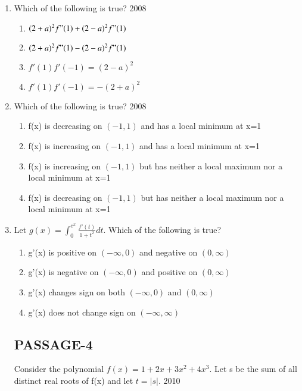 \documentclass[journal,12pt,twocolumn]{IEEEtran}
\theoremstyle{remark}
\begin{document}
\begin{enumerate}
 \item Which of the following is true?
\hfill{2008}
\begin{enumerate}
    \item $(2+a)^2 f"(1)+(2-a)^2 f"(1)$ 
    \item $(2+a)^2 f"(1)-(2-a)^2 f"(1)$
    \item $f'(1)f'(-1)=(2-a)^2$ 
     \item $f'(1)f'(-1)=-(2+a)^2$ 
\end{enumerate}
\item Which of the following is true?
\hfill{2008}
\begin{enumerate}
    \item f(x) is decreasing on $(-1,1)$ and has a local minimum at x=1
    \item f(x) is increasing on $(-1,1)$ and has a local minimum at x=1
    \item f(x) is increasing on $(-1,1)$ but has neither a local maximum nor a local minimum at x=1
    \item f(x) is decreasing on $(-1,1)$ but has neither a local maximum nor a local minimum at x=1
\end{enumerate}
\item Let $g(x)=\int_{0}^{e^x}\frac{f'(t)}{1+t^2}dt$. Which of the following is true?
\begin{enumerate}
    \item g'(x) is positive on $(-\infty,0)$ and negative on $(0,\infty)$
     \item g'(x) is negative on $(-\infty,0)$ and positive on $(0,\infty)$
     \item g'(x) changes sign on both $(-\infty,0)$ and $(0,\infty)$
     \item g'(x) does not change sign on $(-\infty,\infty)$  
\end{enumerate}
\subsection{PASSAGE-4}

Consider the polynomial $f(x) = 1+2x+3x^2+4x^3$. Let s be the sum of all distinct real roots of f(x) and let $t=|s|$.
\hfill{2010}


\end{enumerate}
\end{document}
